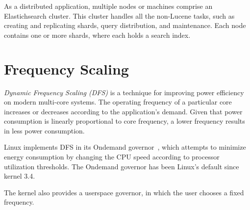 As a distributed application, multiple nodes or machines comprise an Elastichsearch cluster. This cluster handles all the non-Lucene tasks, such as creating and replicating shards, query distribution, and maintenance. Each node contains one or more shards, where each holds a search index.

\section{Frequency Scaling}

\emph{Dynamic Frequency Scaling (DFS)} is a technique for improving power efficiency on modern multi-core systems. The operating frequency of a particular core increases or decreases according to the application's demand. Given that power consumption is linearly proportional to core frequency, a lower frequency results in less power consumption.

Linux implements DFS in its Ondemand governor~\cite{pallipadi2006ondemand}, which attempts to minimize energy consumption by changing the CPU speed according to processor utilization thresholds. The Ondemand governor has been Linux's default since kernel 3.4.

The kernel also provides a userspace governor, in which the user chooses a fixed frequency. 

